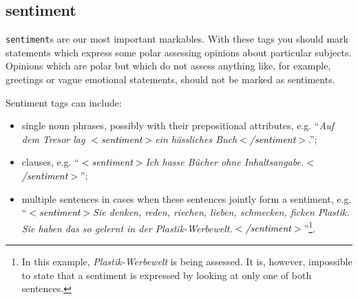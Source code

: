 \documentclass[11pt,a4paper]{article}
\newcommand{\xmltag}[1]{\textcolor{black}{{\small$<$#1$>$}}}
\begin{document}
\subsection{sentiment}
\texttt{sentiment}s are our most important markables.  With these tags
you should mark statements which express some polar assessing opinions
about particular subjects.  Opinions which are polar but which do not
assess anything like, for example, greetings or vague emotional
statements, should not be marked as sentiments.

Sentiment tags can include:
\begin{itemize}
\item single noun phrases, possibly with their prepositional
  attributes, e.g. ``\textit{Auf dem Tresor lag
    \xmltag{sentiment}ein h\"assliches Buch\xmltag{/sentiment}}.'';
\item clauses, e.g. ``\textit{\xmltag{sentiment}Ich hasse B\"ucher
  ohne Inhaltsangabe.\xmltag{/sentiment}}'';
\item multiple sentences in cases when these sentences jointly form
  a sentiment, e.g. ``\textit{\xmltag{sentiment}Sie denken, reden,
    riechen, lieben, schmecken, ficken Plastik. Sie haben das so
    gelernt in der
    Plastik-Werbewelt.\xmltag{/sentiment}}''\footnote{In this
    example, \textit{Plastik-Werbewelt} is being assessed.  It is,
    however, impossible to state that a sentiment is expressed by
    looking at only one of both sentences.}.
\end{itemize}
\end{document}
